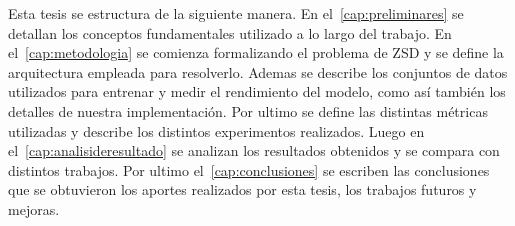 Esta tesis se estructura de la siguiente manera. En el~\autoref{cap:preliminares} se detallan los conceptos fundamentales utilizado a lo largo del trabajo. En el~\autoref{cap:metodologia} se comienza formalizando el problema de ZSD y se define la arquitectura empleada para resolverlo. Ademas se describe los conjuntos de datos utilizados para entrenar y medir el rendimiento del modelo, como así también los detalles de nuestra implementación. Por ultimo se define las distintas métricas utilizadas y describe los distintos experimentos realizados. Luego en el~\autoref{cap:analisideresultado} se analizan los resultados obtenidos y se compara con distintos trabajos. Por ultimo el~\autoref{cap:conclusiones} se escriben las conclusiones que se obtuvieron los aportes realizados por esta tesis, los trabajos futuros y mejoras.
